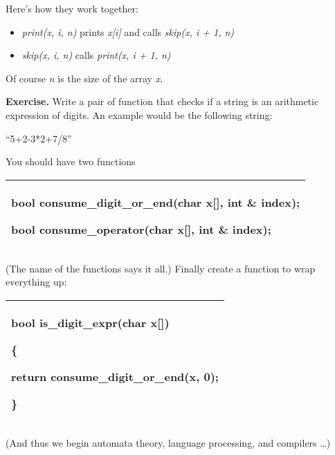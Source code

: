 \documentclass[
]{article}
\providecommand{\tightlist}{%
  \setlength{\itemsep}{0pt}\setlength{\parskip}{0pt}}
\begin{document}
Here's how they work together:

\begin{itemize}
\tightlist
\item
  \emph{print(x, i, n)} prints \emph{x{[}i{]}} and calls \emph{skip(x, i
  + 1, n) }
\item
  \emph{skip(x, i, n)} calls \emph{print(x, i + 1, n)}
\end{itemize}

Of course \emph{n} is the size of the array \emph{x}.

\textbf{Exercise.} Write a pair of function that checks if a string is
an arithmetic expression of digits. An example would be the following
string:

``5+2-3*2+7/8''

You should have two functions

\begin{longtable}[]{@{}l@{}}
\toprule
\endhead
\begin{minipage}[t]{0.97\columnwidth}\raggedright
bool consume\_digit\_or\_end(char x{[}{]}, int \& index);

bool consume\_operator(char x{[}{]}, int \& index);\strut
\end{minipage}\tabularnewline
\bottomrule
\end{longtable}

(The name of the functions says it all.) Finally create a function to
wrap everything up:

\begin{longtable}[]{@{}l@{}}
\toprule
\endhead
\begin{minipage}[t]{0.97\columnwidth}\raggedright
bool is\_digit\_expr(char x{[}{]})

\{

return consume\_digit\_or\_end(x, 0);

\}\strut
\end{minipage}\tabularnewline
\bottomrule
\end{longtable}

(And thus we begin automata theory, language processing, and compilers
\ldots)
\end{document}
